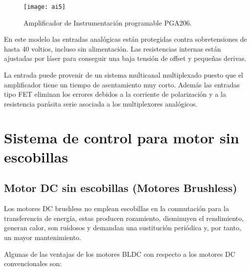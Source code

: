 \begin{figure}[h]
  \centering
  \texttt{[image: ai5]}
  \caption{Amplificador de Instrumentación programable PGA206.}\label{fig:programable}
\end{figure}

En este modelo las entradas analógicas están protegidas contra sobretensiones de hasta 40 voltios, incluso sin alimentación. Las resistencias internas están ajustadas por láser para conseguir una baja tensión de offset y pequeñas derivas.

La entrada puede provenir de un sistema multicanal multiplexado puesto que el amplificador tiene un tiempo de asentamiento muy corto. Además las entradas tipo FET eliminan los errores debidos a la corriente de polarización y a la resistencia parásita serie asociada a los multiplexores analógicos.




\section{Sistema de control para motor sin escobillas} %
\label{sec:sistema_de_control_para_motor_sin_escobillas}


\subsection{Motor DC sin escobillas (Motores Brushless)}
\label{subsec: motor_sin_escobillas}

Los motores DC brushless no emplean escobillas en la conmutación para la transferencia de energía, estas producen rozamiento, disminuyen el rendimiento, generan calor, son ruidosos y demandan una sustitución periódica y, por tanto, un mayor mantenimiento.

Algunas de las ventajas de los motores BLDC con respecto a los motores DC convencionales son:

